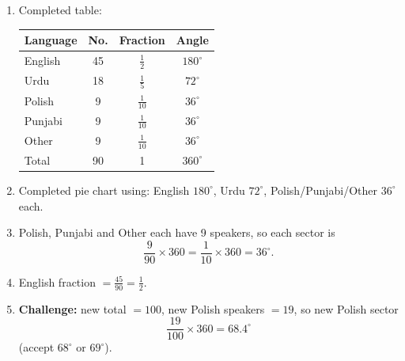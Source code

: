 \documentclass[a4paper,12pt]{article}
\begin{document}
\begin{enumerate}[leftmargin=1.6em, itemsep=2pt]
  \item Completed table:
  \begin{center}
    \renewcommand{\arraystretch}{1.3}
    \begin{tabular}{lccc}
      \hline
      \textbf{Language} & \textbf{No.} & \textbf{Fraction} & \textbf{Angle}\\
      \hline
      English & 45 & \(\frac{1}{2}\)  & \(180^\circ\)\\
      Urdu    & 18 & \(\frac{1}{5}\)  & \(72^\circ\)\\
      Polish  &  9 & \(\frac{1}{10}\) & \(36^\circ\)\\
      Punjabi &  9 & \(\frac{1}{10}\) & \(36^\circ\)\\
      Other   &  9 & \(\frac{1}{10}\) & \(36^\circ\)\\
      \hline
      Total   & 90 & 1 & \(360^\circ\)\\
      \hline
    \end{tabular}
  \end{center}
  \item Completed pie chart using: English \(180^\circ\), Urdu \(72^\circ\), Polish/Punjabi/Other \(36^\circ\) each.
  \item Polish, Punjabi and Other each have 9 speakers, so each sector is
  \[
  \frac{9}{90}\times360=\frac{1}{10}\times360=36^\circ.
  \]
  \item English fraction \(=\frac{45}{90}=\frac{1}{2}\).
  \item \textbf{Challenge:} new total \(=100\), new Polish speakers \(=19\), so new Polish sector
  \[
  \frac{19}{100}\times360=68.4^\circ
  \]
  (accept \(68^\circ\) or \(69^\circ\)).
\end{enumerate}
\end{document}
